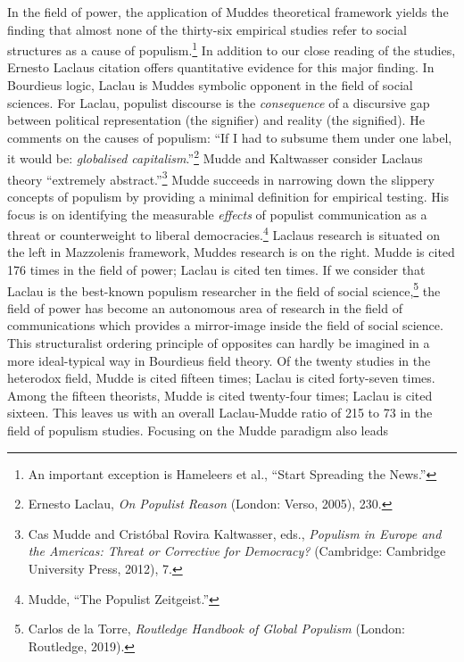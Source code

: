 \documentclass{tufte-handout}
\begin{document}
{{In the field of power, the application of Mudde\textquotesingle s
theoretical framework yields the finding that almost none of the
thirty-six empirical studies refer to social structures as a cause of
populism.\footnote{An important exception is Hameleers et al., ``Start
  Spreading the News.''} In addition to our close reading of the
studies, Ernesto Laclau\textquotesingle s citation offers quantitative
evidence for this major finding. In Bourdieu\textquotesingle s logic,
Laclau is Mudde\textquotesingle s symbolic opponent in the field of
social sciences. For Laclau, populist discourse is the
\emph{consequence} of a discursive gap between political representation
(the signifier) and reality (the signified). He comments on the causes
of populism: ``If I had to subsume them under one label, it would be:
\emph{globalised capitalism}.''\footnote{Ernesto Laclau, \emph{On
  Populist Reason} (London: Verso, 2005), 230.} Mudde and Kaltwasser
consider Laclau\textquotesingle s theory ``extremely
abstract.''\footnote{Cas Mudde and Cristóbal Rovira Kaltwasser, eds.,
  \emph{Populism in Europe and the Americas: Threat or Corrective for
  Democracy?} (Cambridge: Cambridge University Press, 2012), 7.} Mudde
succeeds in narrowing down the slippery concepts of populism by
providing a minimal definition for empirical testing. His focus is on
identifying the measurable \emph{effects} of populist communication as a
threat or counterweight to liberal democracies.\footnote{Mudde, ``The
  Populist Zeitgeist.''} Laclau\textquotesingle s research is situated
on the left in Mazzoleni\textquotesingle s framework,
Mudde\textquotesingle s research is on the right. Mudde is cited 176
times in the field of power; Laclau is cited ten times. If we consider
that Laclau is the best-known populism researcher in the field of social
science,\footnote{Carlos de la Torre, \emph{Routledge Handbook of Global
  Populism} (London: Routledge, 2019).} the field of power has become an
autonomous area of research in the field of communications which
provides a mirror-image inside the field of social science. This
structuralist ordering principle of opposites can hardly be imagined in
a more ideal-typical way in Bourdieu\textquotesingle s field theory. Of
the twenty studies in the heterodox field, Mudde is cited fifteen times;
Laclau is cited forty-seven times. Among the fifteen theorists, Mudde is
cited twenty-four times; Laclau is cited sixteen. This leaves us with an
overall Laclau-Mudde ratio of 215 to 73 in the field of populism
studies. Focusing on the Mudde paradigm also leads

}}
\end{document}
